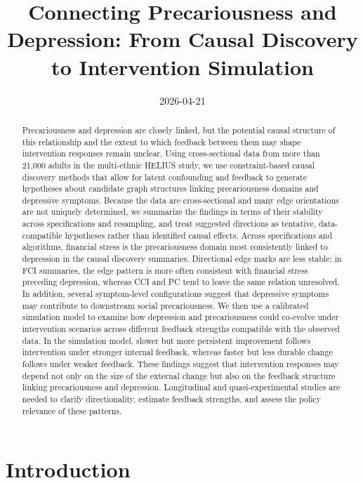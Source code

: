 \documentclass[
]{article}
\title{Connecting Precariousness and Depression: From Causal Discovery
to Intervention Simulation}
\author{%
}
\date{2026-04-21}
\begin{document}
\maketitle
\begin{abstract}
\noindent Precariousness and depression are closely linked, but the
potential causal structure of this relationship and the extent to which
feedback between them may shape intervention responses remain unclear.
Using cross-sectional data from more than 21,000 adults in the
multi-ethnic HELIUS study, we use constraint-based causal discovery
methods that allow for latent confounding and feedback to generate
hypotheses about candidate graph structures linking precariousness
domains and depressive symptoms. Because the data are cross-sectional
and many edge orientations are not uniquely determined, we summarize the
findings in terms of their stability across specifications and
resampling, and treat suggested directions as tentative, data-compatible
hypotheses rather than identified causal effects. Across specifications
and algorithms, financial stress is the precariousness domain most
consistently linked to depression in the causal discovery summaries.
Directional edge marks are less stable: in FCI summaries, the edge
pattern is more often consistent with financial stress preceding
depression, whereas CCI and PC tend to leave the same relation
unresolved. In addition, several symptom-level configurations suggest
that depressive symptoms may contribute to downstream social
precariousness. We then use a calibrated simulation model to examine how
depression and precariousness could co-evolve under intervention
scenarios across different feedback strengths compatible with the
observed data. In the simulation model, slower but more persistent
improvement follows intervention under stronger internal feedback,
whereas faster but less durable change follows under weaker feedback.
These findings suggest that intervention responses may depend not only
on the size of the external change but also on the feedback structure
linking precariousness and depression. Longitudinal and
quasi-experimental studies are needed to clarify directionality,
estimate feedback strengths, and assess the policy relevance of these
patterns.
\end{abstract}


\section{Introduction}\label{introduction}
\end{document}
